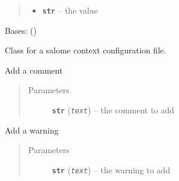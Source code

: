 \documentclass[a4paper,10pt,english]{sphinxmanual}
\begin{document}
\begin{fulllineitems}
\begin{fulllineitems}
\begin{quote}
\begin{description}
\begin{itemize}
\item {} 
\textbf{\texttt{str}} -- the value

\end{itemize}

\end{description}\end{quote}

\end{fulllineitems}


\end{fulllineitems}


\begin{fulllineitems}
\label{commands/apidoc/src:src.fileEnviron.ContextFileEnviron}
Bases: {\hyperref[commands/apidoc/src:src.fileEnviron.FileEnviron]{}} ()

Class for a salome context configuration file.

\begin{fulllineitems}
\label{commands/apidoc/src:src.fileEnviron.ContextFileEnviron.add_echo}
Add a comment
\begin{quote}\begin{description}
\item[{Parameters}] \leavevmode
\textbf{\texttt{str}} (\emph{\texttt{text}}) -- the comment to add

\end{description}\end{quote}

\end{fulllineitems}


\begin{fulllineitems}
\label{commands/apidoc/src:src.fileEnviron.ContextFileEnviron.add_warning}
Add a warning
\begin{quote}\begin{description}
\item[{Parameters}] \leavevmode
\textbf{\texttt{str}} (\emph{\texttt{text}}) -- the warning to add


\end{description}
\end{quote}
\end{fulllineitems}
\end{fulllineitems}
\end{document}
